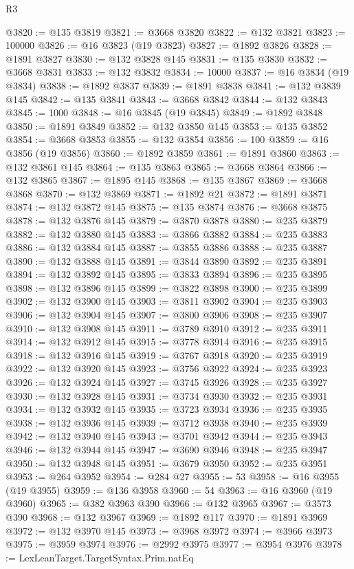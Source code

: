 \begin{lexlean}{R3}
\begin{coremodule}
@3820 := @135 @3819
@3821 := @3668 @3820
@3822 := @132 @3821
@3823 := 100000
@3826 := @16 @3823 (@19 @3823)
@3827 := @1892 @3826
@3828 := @1891 @3827
@3830 := @132 @3828 @145
@3831 := @135 @3830
@3832 := @3668 @3831
@3833 := @132 @3832
@3834 := 10000
@3837 := @16 @3834 (@19 @3834)
@3838 := @1892 @3837
@3839 := @1891 @3838
@3841 := @132 @3839 @145
@3842 := @135 @3841
@3843 := @3668 @3842
@3844 := @132 @3843
@3845 := 1000
@3848 := @16 @3845 (@19 @3845)
@3849 := @1892 @3848
@3850 := @1891 @3849
@3852 := @132 @3850 @145
@3853 := @135 @3852
@3854 := @3668 @3853
@3855 := @132 @3854
@3856 := 100
@3859 := @16 @3856 (@19 @3856)
@3860 := @1892 @3859
@3861 := @1891 @3860
@3863 := @132 @3861 @145
@3864 := @135 @3863
@3865 := @3668 @3864
@3866 := @132 @3865
@3867 := @1895 @145
@3868 := @135 @3867
@3869 := @3668 @3868
@3870 := @132 @3869
@3871 := @1892 @21
@3872 := @1891 @3871
@3874 := @132 @3872 @145
@3875 := @135 @3874
@3876 := @3668 @3875
@3878 := @132 @3876 @145
@3879 := @3870 @3878
@3880 := @235 @3879
@3882 := @132 @3880 @145
@3883 := @3866 @3882
@3884 := @235 @3883
@3886 := @132 @3884 @145
@3887 := @3855 @3886
@3888 := @235 @3887
@3890 := @132 @3888 @145
@3891 := @3844 @3890
@3892 := @235 @3891
@3894 := @132 @3892 @145
@3895 := @3833 @3894
@3896 := @235 @3895
@3898 := @132 @3896 @145
@3899 := @3822 @3898
@3900 := @235 @3899
@3902 := @132 @3900 @145
@3903 := @3811 @3902
@3904 := @235 @3903
@3906 := @132 @3904 @145
@3907 := @3800 @3906
@3908 := @235 @3907
@3910 := @132 @3908 @145
@3911 := @3789 @3910
@3912 := @235 @3911
@3914 := @132 @3912 @145
@3915 := @3778 @3914
@3916 := @235 @3915
@3918 := @132 @3916 @145
@3919 := @3767 @3918
@3920 := @235 @3919
@3922 := @132 @3920 @145
@3923 := @3756 @3922
@3924 := @235 @3923
@3926 := @132 @3924 @145
@3927 := @3745 @3926
@3928 := @235 @3927
@3930 := @132 @3928 @145
@3931 := @3734 @3930
@3932 := @235 @3931
@3934 := @132 @3932 @145
@3935 := @3723 @3934
@3936 := @235 @3935
@3938 := @132 @3936 @145
@3939 := @3712 @3938
@3940 := @235 @3939
@3942 := @132 @3940 @145
@3943 := @3701 @3942
@3944 := @235 @3943
@3946 := @132 @3944 @145
@3947 := @3690 @3946
@3948 := @235 @3947
@3950 := @132 @3948 @145
@3951 := @3679 @3950
@3952 := @235 @3951
@3953 := @264 @3952
@3954 := @284 @27
@3955 := 53
@3958 := @16 @3955 (@19 @3955)
@3959 := @136 @3958
@3960 := 54
@3963 := @16 @3960 (@19 @3960)
@3965 := @382 @3963 @390
@3966 := @132 @3965
@3967 := @3573 @390
@3968 := @132 @3967
@3969 := @1892 @117
@3970 := @1891 @3969
@3972 := @132 @3970 @145
@3973 := @3968 @3972
@3974 := @3966 @3973
@3975 := @3959 @3974
@3976 := @2992 @3975
@3977 := @3954 @3976
@3978 := LexLeanTarget.TargetSyntax.Prim.natEq

\end{coremodule}
\end{lexlean}

